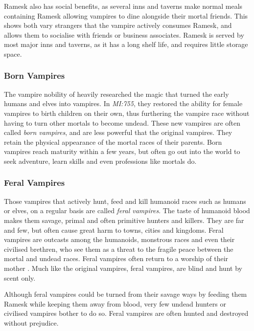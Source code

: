 Ramesk also has social benefits, as several inns and taverns make normal meals
containing Ramesk allowing vampires to dine alongside their mortal friends.
This shows both vary strangers that the vampire actively consumes Ramesk, and
allows them to socialise with friends or business associates. Ramesk is served
by most major inns and taverns, as it has a long shelf life, and requires
little storage space.

\subsubsection{Born Vampires}
\label{sec:Born Vampires}

The vampire nobility of  heavily researched the magic
that turned the early humans and elves into vampires. In \emph{MI:755}, they
restored the ability for female vampires to birth children on their own, thus
furthering the vampire race without having to turn other mortals to become
undead. These new vampires are often called \emph{born vampires}, and are less
powerful that the original vampires. They retain the physical appearance of
the mortal races of their parents. Born vampires reach maturity within a few
years, but often go out into the world to seek adventure, learn skills and
even professions like mortals do.

\subsubsection{Feral Vampires}
\label{sec:Feral Vampires}

Those vampires that actively hunt, feed and kill humanoid races such as
humans or elves, on a regular basis are called \emph{feral vampires}. The
taste of humanoid blood makes them savage, primal and often primitive hunters
and killers. They are far and few, but often cause great harm to towns, cities
and kingdoms. Feral vampires are outcasts among the humanoids, monstrous races
and even their civilised brethren, who see them as a threat to the fragile
peace between the mortal and undead races. Feral vampires often return to a
worship of their mother . Much like the original vampires,
feral vampires, are blind and hunt by scent only.

Although feral vampires could be turned from their savage ways by feeding them
Ramesk while keeping them away from blood, very few undead hunters or
civilised vampires bother to do so. Feral vampires are often hunted and
destroyed without prejudice.

